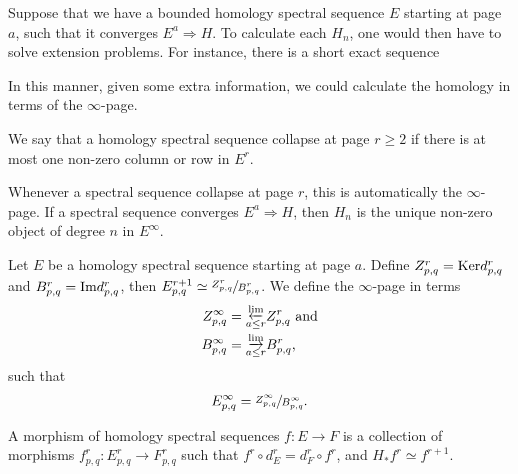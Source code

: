 \documentclass[../thesis.tex]{subfiles}
\begin{document}
        Suppose that we have a bounded homology spectral sequence $E$ starting at page $a$, such that it converges $E^a \Rightarrow H$. To calculate each $H_n$, one would then have to solve extension problems. For instance, there is a short exact sequence
        \begin{center}
        \end{center}
        In this manner, given some extra information, we could calculate the homology in terms of the $\infty$-page.

        \begin{definition}[Collapse]
            We say that a homology spectral sequence collapse at page $r \geq 2$ if there is at most one non-zero column or row in $E^r$.
        \end{definition}

        Whenever a spectral sequence collapse at page $r$, this is automatically the $\infty$-page. If a spectral sequence converges $E^a \Rightarrow H$, then $H_n$ is the unique non-zero object of degree $n$ in $E^\infty$.

        \begin{definition}
            Let $E$ be a homology spectral sequence starting at page $a$. Define $Z^r_{p,q} = \tt{Ker}d^r_{p,q}$ and $B^r_{p,q} = \tt{Im}d^r_{p,q}$, then $E^{r+1}_{p,q} \simeq \sfrac{Z^r_{p,q}}{B^r_{p,q}}$. We define the $\infty$-page in terms
            \begin{align*}
                Z^\infty_{p,q} & = \substack{\varprojlim \\ a \leq r}Z^r_{p,q}\tt{ and} \\
                B^\infty_{p,q} & = \substack{\varinjlim \\ a \leq r}B^r_{p,q}\tt{,} \\
            \end{align*}
            such that
            \begin{align*}
                E^\infty_{p,q} = \sfrac{Z^\infty_{p,q}}{B^\infty_{p,q}}\tt{.}
            \end{align*}
        \end{definition}

        \begin{definition}
            A morphism of homology spectral sequences $f : E \rightarrow F$ is a collection of morphisms $f^r_{p,q} : E^r_{p,q} \rightarrow F^r_{p,q}$ such that $f^r\circ d^r_E = d^r_F \circ f^r$, and $H_*f^r \simeq f^{r+1}$.
        \end{definition}
\end{document}
